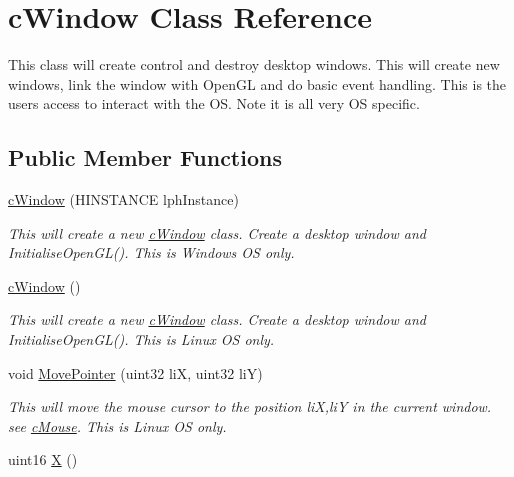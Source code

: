 \hypertarget{classc_window}{
\section{cWindow Class Reference}
\label{classc_window}
}


This class will create control and destroy desktop windows. This will create new windows, link the window with OpenGL and do basic event handling. This is the users access to interact with the OS. Note it is all very OS specific.  


\subsection*{Public Member Functions}
\begin{DoxyCompactItemize}
\item 
\hypertarget{classc_window_ae87d783f8bc3e30f751764ac6b078c38}{
\hyperlink{classc_window_ae87d783f8bc3e30f751764ac6b078c38}{cWindow} (HINSTANCE lphInstance)}
\label{classc_window_ae87d783f8bc3e30f751764ac6b078c38}

\begin{DoxyCompactList}\small\item\em This will create a new \hyperlink{classc_window}{cWindow} class. Create a desktop window and InitialiseOpenGL(). This is Windows OS only. \end{DoxyCompactList}\item 
\hypertarget{classc_window_a240840abcf5c64260f5fb43474f70084}{
\hyperlink{classc_window_a240840abcf5c64260f5fb43474f70084}{cWindow} ()}
\label{classc_window_a240840abcf5c64260f5fb43474f70084}

\begin{DoxyCompactList}\small\item\em This will create a new \hyperlink{classc_window}{cWindow} class. Create a desktop window and InitialiseOpenGL(). This is Linux OS only. \end{DoxyCompactList}\item 
\hypertarget{classc_window_afa140a737ae105dc72a7e2e99af4b8f7}{
void \hyperlink{classc_window_afa140a737ae105dc72a7e2e99af4b8f7}{MovePointer} (uint32 liX, uint32 liY)}
\label{classc_window_afa140a737ae105dc72a7e2e99af4b8f7}

\begin{DoxyCompactList}\small\item\em This will move the mouse cursor to the position liX,liY in the current window. see \hyperlink{classc_mouse}{cMouse}. This is Linux OS only. \end{DoxyCompactList}\item 
\hypertarget{classc_window_a765dbf60e47e928d80f888b1150b10ce}{
uint16 \hyperlink{classc_window_a765dbf60e47e928d80f888b1150b10ce}{X} ()}
\label{classc_window_a765dbf60e47e928d80f888b1150b10ce}


\end{DoxyCompactItemize}
